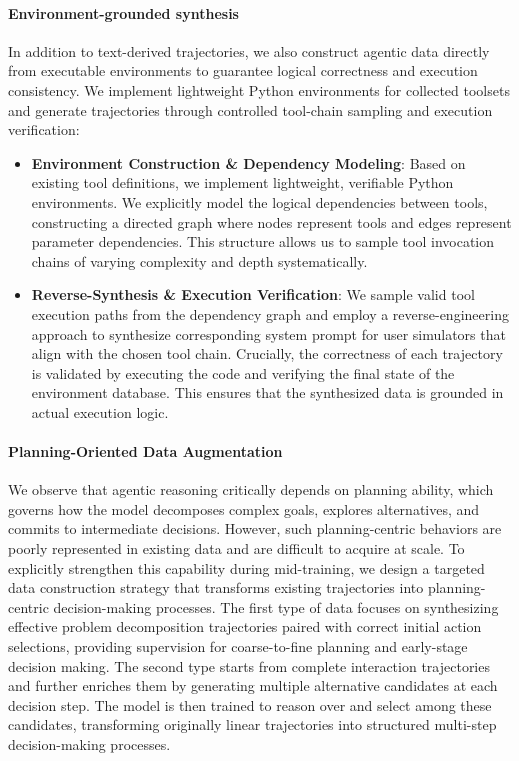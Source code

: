 \documentclass{article}
\begin{document}
\paragraph{Environment-grounded synthesis} In addition to text-derived trajectories, we also construct agentic data directly from executable environments to guarantee logical correctness and execution consistency.
We implement lightweight Python environments for collected toolsets and generate trajectories through controlled tool-chain sampling and execution verification:
\begin{itemize}
    \item \textbf{Environment Construction \& Dependency Modeling}:
    Based on existing tool definitions, we implement lightweight, verifiable Python environments. We explicitly model the logical dependencies between tools, constructing a directed graph where nodes represent tools and edges represent parameter dependencies. This structure allows us to sample tool invocation chains of varying complexity and depth systematically.
    
    \item \textbf{Reverse-Synthesis \& Execution Verification}:
    We sample valid tool execution paths from the dependency graph and employ a reverse-engineering approach to synthesize corresponding system prompt for user simulators that align with the chosen tool chain. Crucially, the correctness of each trajectory is validated by executing the code and verifying the final state of the environment database. This ensures that the synthesized data is grounded in actual execution logic.
\end{itemize}

\paragraph{Planning-Oriented Data Augmentation}
We observe that agentic reasoning critically depends on planning ability, which governs how the model decomposes complex goals, explores alternatives, and commits to intermediate decisions. 
However, such planning-centric behaviors are poorly represented in existing data and are difficult to acquire at scale.
To explicitly strengthen this capability during mid-training, we design a targeted data construction strategy that transforms existing trajectories into planning-centric decision-making processes.
The first type of data focuses on synthesizing effective problem decomposition trajectories paired with correct initial action selections, providing supervision for coarse-to-fine planning and early-stage decision making.
The second type starts from complete interaction trajectories and further enriches them by generating multiple alternative candidates at each decision step. The model is then trained to reason over and select among these candidates, transforming originally linear trajectories into structured multi-step decision-making processes.
\end{document}
